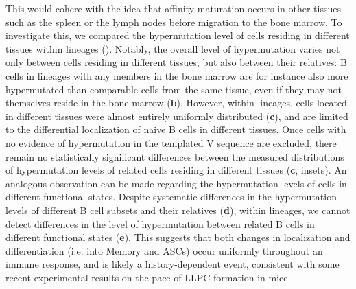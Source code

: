This would cohere with the idea that affinity maturation occurs in other tissues such as the spleen or the lymph nodes before migration to the bone marrow. To investigate this, we compared the hypermutation level of cells residing in different tissues within lineages (). Notably, the overall level of hypermutation varies not only between cells residing in different tissues, but also between their relatives: B cells in lineages with any members in the bone marrow are for instance also more hypermutated than comparable cells from the same tissue, even if they may not themselves reside in the bone marrow (\textbf{b}). However, within lineages, cells located in different tissues were almost entirely uniformly distributed (\textbf{c}), and are limited to the differential localization of naive B cells in different tissues. Once cells with no evidence of hypermutation in the templated V sequence are excluded, there remain no statistically significant differences between the measured distributions of hypermutation levels of related cells residing in different tissues (\textbf{c}, insets).  An analogous observation can be made regarding the hypermutation levels of cells in different functional states. Despite systematic differences in the hypermutation levels of  different B cell subsets and their relatives (\textbf{d}), within lineages, we cannot detect differences in the level of hypermutation between related B cells in different functional states (\textbf{e}). This suggests that both changes in localization and differentiation (i.e. into Memory and ASCs) occur uniformly throughout an immune response, and is likely a history-dependent event, consistent with some recent experimental results on the pace of LLPC formation in mice. 


